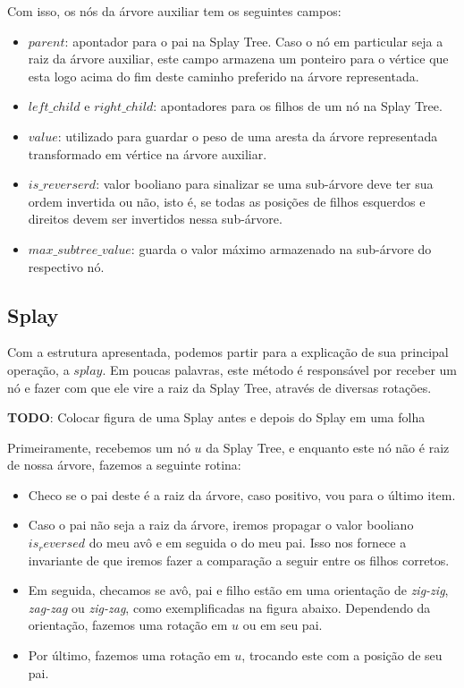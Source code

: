 Com isso, os nós da árvore auxiliar tem os seguintes campos:

\begin{itemize}
    \item $parent$: apontador para o pai na Splay Tree. Caso o nó em particular seja a raiz da árvore auxiliar, este campo armazena um ponteiro para o vértice que esta logo acima do fim deste caminho preferido na árvore representada.
    \item $left\_child$ e $right\_child$: apontadores para os filhos de um nó na Splay Tree.
    \item $value$: utilizado para guardar o peso de uma aresta da árvore representada transformado em vértice na árvore auxiliar.
    \item $is\_reverserd$: valor booliano para sinalizar se uma sub-árvore deve ter sua ordem invertida ou não, isto é, se todas as posições de filhos esquerdos e direitos devem ser invertidos nessa  sub-árvore.
    \item $max\_subtree\_value$: guarda o valor máximo armazenado na sub-árvore do respectivo nó.
\end{itemize}

\subsection{Splay}
\label{subsection:lct-splay-splay}

Com a estrutura apresentada, podemos partir para a explicação de sua principal operação, a $splay$. Em poucas palavras, este método é responsável por receber um nó e fazer com que ele vire a raiz da Splay Tree, através de diversas rotações.

\begin{center}
    \textbf{TODO}: Colocar figura de uma Splay antes e depois do Splay em uma folha
\end{center}

Primeiramente, recebemos um nó $u$ da Splay Tree, e enquanto este nó não é raiz de nossa árvore, fazemos a seguinte rotina:

\begin{itemize}
    \item Checo se o pai deste é a raiz da árvore, caso positivo, vou para o último item.
    \item Caso o pai não seja a raiz da árvore, iremos propagar o valor booliano $is_reversed$ do meu avô e em seguida o do meu pai. Isso nos fornece a invariante de que iremos fazer a comparação a seguir entre os filhos corretos.
    \item Em seguida, checamos se avô, pai e filho estão em uma orientação de \textit{zig-zig}, \textit{zag-zag} ou \textit{zig-zag}, como exemplificadas na figura abaixo. Dependendo da orientação, fazemos uma rotação em $u$ ou em seu pai.
    \item Por último, fazemos uma rotação em $u$, trocando este com a posição de seu pai.
\end{itemize}

